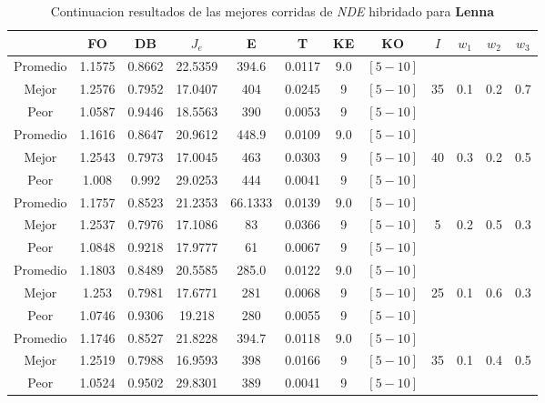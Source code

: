 \begin{table}[h!]
    \footnotesize
    \begin{center}
        \begin{tabular}{|c|c|c|c|c|c|c|c|c|c|c|c|}
        \hline
            & {\bf FO} & {\bf DB} & $J_e$ & {\bf E} & {\bf T} & {\bf KE} & {\bf KO} & $I$ & $w_1$ & $w_2$ & $w_3$ \\
        \hline
        \hline
            Promedio  & 1.1575 & 0.8662 & 22.5359 & 394.6 & 0.0117 & 9.0 & $[5-10]$ &  &  &  & \\
            \cline{1-8}
            Mejor & 1.2576 & 0.7952  & 17.0407 & 404 & 0.0245 & 9 & $[5-10]$ & 35 & 0.1 & 0.2 & 0.7\\
            \cline{1-8}
            Peor & 1.0587 & 0.9446  & 18.5563 & 390 & 0.0053 & 9 & $[5-10]$ &  &  &  & \\
        \hline
        \hline
            Promedio  & 1.1616 & 0.8647 & 20.9612 & 448.9 & 0.0109 & 9.0 & $[5-10]$ &  &  &  & \\
            \cline{1-8}
            Mejor & 1.2543 & 0.7973  & 17.0045 & 463 & 0.0303 & 9 & $[5-10]$ & 40 & 0.3 & 0.2 & 0.5\\
            \cline{1-8}
            Peor & 1.008 & 0.992  & 29.0253 & 444 & 0.0041 & 9 & $[5-10]$ &  &  &  & \\
        \hline
        \hline
            Promedio  & 1.1757 & 0.8523 & 21.2353 & 66.1333 & 0.0139 & 9.0 & $[5-10]$ &  &  &  & \\
            \cline{1-8}
            Mejor & 1.2537 & 0.7976  & 17.1086 & 83 & 0.0366 & 9 & $[5-10]$ & 5 & 0.2 & 0.5 & 0.3\\
            \cline{1-8}
            Peor & 1.0848 & 0.9218  & 17.9777 & 61 & 0.0067 & 9 & $[5-10]$ &  &  &  & \\
        \hline
        \hline
            Promedio  & 1.1803 & 0.8489 & 20.5585 & 285.0 & 0.0122 & 9.0 & $[5-10]$ &  &  &  & \\
            \cline{1-8}
            Mejor & 1.253 & 0.7981  & 17.6771 & 281 & 0.0068 & 9 & $[5-10]$ & 25 & 0.1 & 0.6 & 0.3\\
            \cline{1-8}
            Peor & 1.0746 & 0.9306  & 19.218 & 280 & 0.0055 & 9 & $[5-10]$ &  &  &  & \\
        \hline
        \hline
            Promedio  & 1.1746 & 0.8527 & 21.8228 & 394.7 & 0.0118 & 9.0 & $[5-10]$ &  &  &  & \\
            \cline{1-8}
            Mejor & 1.2519 & 0.7988  & 16.9593 & 398 & 0.0166 & 9 & $[5-10]$ & 35 & 0.1 & 0.4 & 0.5\\
            \cline{1-8}
            Peor & 1.0524 & 0.9502  & 29.8301 & 389 & 0.0041 & 9 & $[5-10]$ &  &  &  & \\
        \hline
        \end{tabular}
        \caption{Continuacion resultados de las mejores corridas de \emph{NDE} hibridado para {\bf Lenna}}
        \label{tb:tabledehibimgc}
    \end{center}
\end{table}
